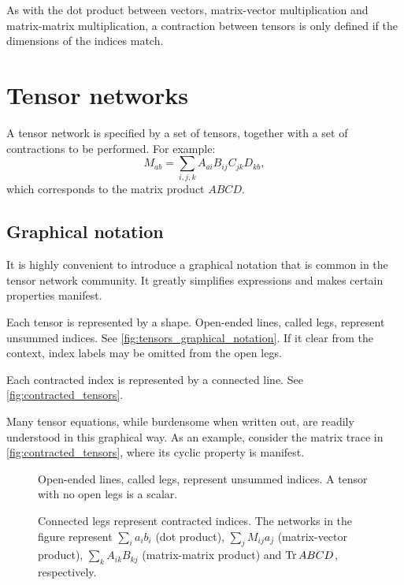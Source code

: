 As with the dot product between vectors, matrix-vector multiplication and
matrix-matrix multiplication, a contraction between tensors is only defined if
the dimensions of the indices match.

\section{Tensor networks}

A tensor network is specified by a set of tensors, together with a set of contractions to be performed. For example:
\begin{equation}
  M_{a b} = \sum_{i, j, k} A_{a i} B_{i j} C_{j k} D_{k b},
\end{equation}
which corresponds to the matrix product $A B C D$.

\subsection{Graphical notation}
It is highly convenient to introduce a graphical notation that is common in the
tensor network community. It greatly simplifies expressions and makes certain
properties manifest.

Each tensor is represented by a shape. Open-ended lines, called legs, represent unsummed
indices. See \autoref{fig:tensors_graphical_notation}. If it clear from the context, index
labels may be omitted from the open legs.

Each contracted index is represented by a connected line. See
\autoref{fig:contracted_tensors}.

Many tensor equations, while burdensome when written out, are readily
understood in this graphical way. As an example, consider the matrix trace in
\autoref{fig:contracted_tensors}, where its cyclic property is manifest.

\begin{figure}
  
  \caption{Open-ended lines, called legs, represent unsummed indices. A tensor
  with no open legs is a scalar.}
  \label{fig:tensors_graphical_notation}
\end{figure}

\begin{figure}
  
  \caption{Connected legs represent contracted indices. The networks in the
  figure represent $\sum_i a_i b_i$ (dot product),
  $\sum_j M_{i j} a_j$ (matrix-vector product), $\sum_{k} A_{i k} B_{k
  j}$ (matrix-matrix product) and $\operatorname{Tr} A B C D$, respectively.}
  \label{fig:contracted_tensors}
\end{figure}

